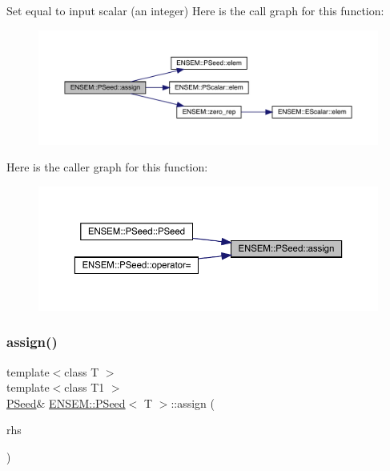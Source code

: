 Set equal to input scalar (an integer) Here is the call graph for this function\+:
\nopagebreak
\begin{figure}[H]
\begin{center}
\leavevmode
\includegraphics[width=350pt]{dc/d14/classENSEM_1_1PSeed_a8d74bd21af23dfb165937c3bb546ea8f_cgraph}
\end{center}
\end{figure}
Here is the caller graph for this function\+:\nopagebreak
\begin{figure}[H]
\begin{center}
\leavevmode
\includegraphics[width=350pt]{dc/d14/classENSEM_1_1PSeed_a8d74bd21af23dfb165937c3bb546ea8f_icgraph}
\end{center}
\end{figure}
\mbox{\label{classENSEM_1_1PSeed_a8d74bd21af23dfb165937c3bb546ea8f}} 
\subsubsection{\texorpdfstring{assign()}{assign()}\hspace{0.1cm}{\footnotesize\ttfamily [2/2]}}
{\footnotesize\ttfamily template$<$class T $>$ \\
template$<$class T1 $>$ \\
\mbox{\hyperlink{classENSEM_1_1PSeed}{P\+Seed}}\& \mbox{\hyperlink{classENSEM_1_1PSeed}{E\+N\+S\+E\+M\+::\+P\+Seed}}$<$ T $>$\+::assign (\begin{DoxyParamCaption}\item[{const \mbox{\hyperlink{classENSEM_1_1PScalar}{P\+Scalar}}$<$ T1 $>$ \&}]{rhs }\end{DoxyParamCaption})\hspace{0.3cm}{\ttfamily [inline]}}



